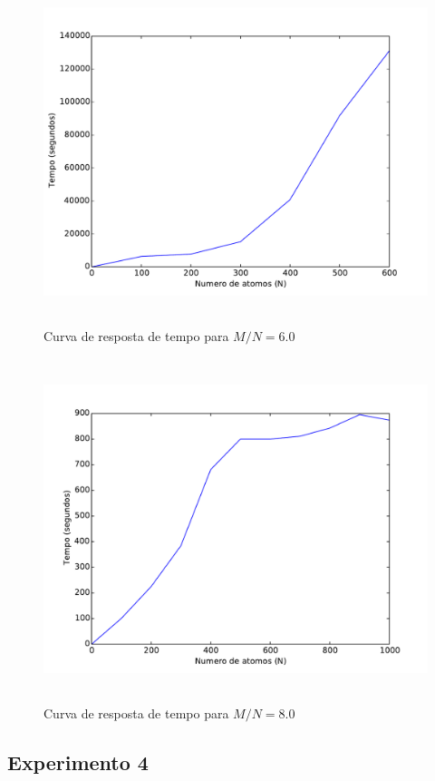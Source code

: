 		\begin{figure}[H]
			\centering
			\includegraphics[height=10cm]{images/max3sat_mn60}
			\caption{Curva de resposta de tempo para $M/N=6.0$}
			\label{fig:max3satmn60}
		\end{figure}
		
		\begin{figure}[H]
			\centering
			\includegraphics[height=10cm]{images/max3sat_mn80}
			\caption{Curva de resposta de tempo para $M/N=8.0$}
			\label{fig:max3satmn80}
		\end{figure}

\subsection{Experimento 4}
